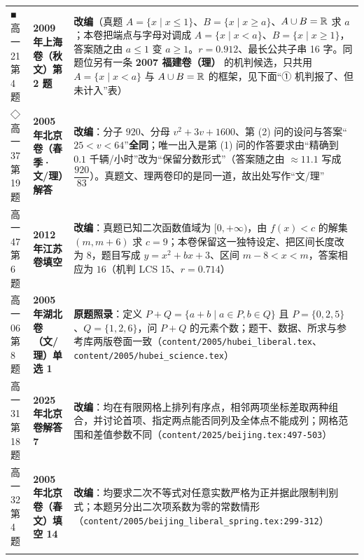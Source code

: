 \documentclass[a4paper,11pt]{article}
\begin{document}
\begin{xltabular}{\textwidth}{@{}>{\raggedright\arraybackslash}p{2.85cm}>{\raggedright\arraybackslash}p{3.99cm}>{\raggedright\arraybackslash}p{7.89cm}@{}}
■高一21 第 4 题 & \textbf{2009 年上海卷（秋文）第 2 题} & \textbf{改编}（真题 \(A=\allowbreak \{x\mid\allowbreak  x\leqslant\allowbreak 1\}\)、\(B=\allowbreak \{x\mid\allowbreak  x\geqslant\allowbreak  a\}\)、\(A\cup\allowbreak  B=\allowbreak \mathbb{R}\) 求 \(a\)；本卷把端点与字母对调成 \(A=\allowbreak \{x\mid\allowbreak  x<a\}\)、\(B=\allowbreak \{x\mid\allowbreak  x\geqslant\allowbreak 1\}\)，答案随之由 \(a\leqslant\allowbreak 1\) 变 \(a\geqslant\allowbreak 1\)。\(r=\allowbreak 0.912\)、最长公共子串 16 字。同题位另有一条 \textbf{2007 福建卷（理）} 的机判候选，只共用 \(A=\allowbreak \{x\mid\allowbreak  x<a\}\) 与 \(A\cup\allowbreak  B=\allowbreak \mathbb{R}\) 的框架，见下面``① 机判报了、但未计入''表） \\ \addlinespace[1pt]
◇高一37 第 19 题 & \textbf{2005 年北京卷（春季·文/理）解答} & \textbf{改编}：分子 \(920\)、分母 \(v^2+\allowbreak 3v+\allowbreak 1600\)、第 (2) 问的设问与答案``\(25<v<64\)''\textbf{全同}；唯一出入是第 (1) 问的作答要求由``精确到 \(0.1\) 千辆/小时''改为``保留分数形式''（答案随之由 \(\approx11.1\) 写成 \(\dfrac{920}{83}\)）。真题文、理两卷印的是同一道，故出处写作``文/理'' \\ \addlinespace[1pt]
高一47 第 6 题 & \textbf{2012 年江苏卷填空} & \textbf{改编}：真题已知二次函数值域为 \([0,\allowbreak +\allowbreak \infty)\)，由 \(f(x)<c\) 的解集 \((m,m+\allowbreak 6)\) 求 \(c=\allowbreak 9\)；本卷保留这一独特设定、把区间长度改为 \(8\)，题目写成 \(y=x^2+bx+\allowbreak 3\)、区间 \(m-8<x<m\)，答案相应为 \(16\)（机判 LCS 15、\(r=\allowbreak 0.714\)） \\ \addlinespace[1pt]
高一06 第 8 题 & \textbf{2005 年湖北卷（文/理）单选 1} & \textbf{原题照录}：定义 \(P+Q=\allowbreak \{a+b\mid\allowbreak  a\in P,b\in Q\}\) 且 \(P=\allowbreak \{0,\allowbreak 2,\allowbreak 5\}\)、\(Q=\allowbreak \{1,\allowbreak 2,\allowbreak 6\}\)，问 \(P+Q\) 的元素个数；题干、数据、所求与参考库两版卷面一致（\texttt{content/\allowbreak{}2005/\allowbreak{}hubei\_liberal.tex}、\texttt{content/\allowbreak{}2005/\allowbreak{}hubei\_science.tex}） \\ \addlinespace[1pt]
高一31 第 18 题 & \textbf{2025 年北京卷解答 7} & \textbf{改编}：均在有限网格上排列有序点，相邻两项坐标差取两种组合，并讨论首项、指定两点能否同列及全体点不能成列；网格范围和差值参数不同（\texttt{content/\allowbreak{}2025/\allowbreak{}beijing.tex:497-\allowbreak{}503}） \\ \addlinespace[1pt]
高一32 第 4 题 & \textbf{2005 年北京卷（春文）填空 14} & \textbf{改编}：均要求二次不等式对任意实数严格为正并据此限制判别式；本题另分出二次项系数为零的常数情形（\texttt{content/\allowbreak{}2005/\allowbreak{}beijing\_liberal\_spring.tex:299-\allowbreak{}312}） \\ \addlinespace[1pt]

\end{xltabular}
\end{document}
